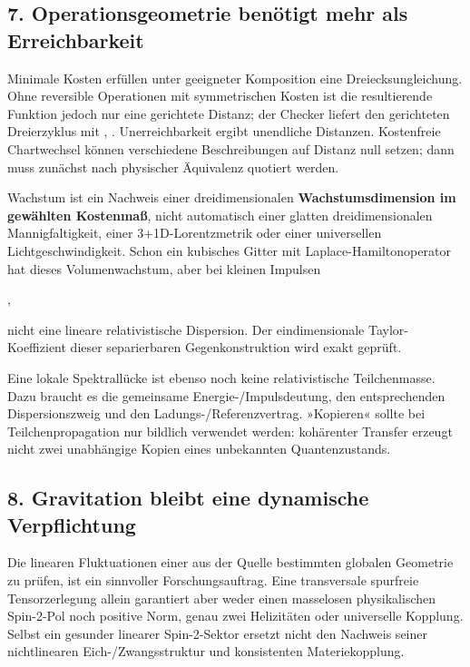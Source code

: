 \subsection{7. Operationsgeometrie benötigt mehr als
Erreichbarkeit}\label{operationsgeometrie-benuxf6tigt-mehr-als-erreichbarkeit}

Minimale Kosten erfüllen unter geeigneter Komposition eine
Dreiecksungleichung. Ohne reversible Operationen mit symmetrischen
Kosten ist die resultierende Funktion jedoch nur eine gerichtete
Distanz; der Checker liefert den gerichteten Dreierzyklus mit
, . Unerreichbarkeit ergibt
unendliche Distanzen. Kostenfreie Chartwechsel können verschiedene
Beschreibungen auf Distanz null setzen; dann muss zunächst nach
physischer Äquivalenz quotiert werden.

Wachstum  ist ein Nachweis einer
dreidimensionalen \textbf{Wachstumsdimension im gewählten Kostenmaß},
nicht automatisch einer glatten dreidimensionalen Mannigfaltigkeit,
einer 3+1D-Lorentzmetrik oder einer universellen Lichtgeschwindigkeit.
Schon ein kubisches Gitter mit Laplace-Hamiltonoperator hat dieses
Volumenwachstum, aber bei kleinen Impulsen

,

nicht eine lineare relativistische Dispersion. Der eindimensionale
Taylor-Koeffizient dieser separierbaren Gegenkonstruktion wird exakt
geprüft.

Eine lokale Spektrallücke ist ebenso noch keine relativistische
Teilchenmasse. Dazu braucht es die gemeinsame Energie-/Impulsdeutung,
den entsprechenden Dispersionszweig und den Ladungs-/Referenzvertrag.
»Kopieren« sollte bei Teilchenpropagation nur bildlich verwendet werden:
kohärenter Transfer erzeugt nicht zwei unabhängige Kopien eines
unbekannten Quantenzustands.

\subsection{8. Gravitation bleibt eine dynamische
Verpflichtung}\label{gravitation-bleibt-eine-dynamische-verpflichtung}

Die linearen Fluktuationen einer aus der Quelle bestimmten globalen
Geometrie zu prüfen, ist ein sinnvoller Forschungsauftrag. Eine
transversale spurfreie Tensorzerlegung allein garantiert aber weder
einen masselosen physikalischen Spin-2-Pol noch positive Norm, genau
zwei Helizitäten oder universelle Kopplung. Selbst ein gesunder linearer
Spin-2-Sektor ersetzt nicht den Nachweis seiner nichtlinearen
Eich-/Zwangsstruktur und konsistenten Materiekopplung.

